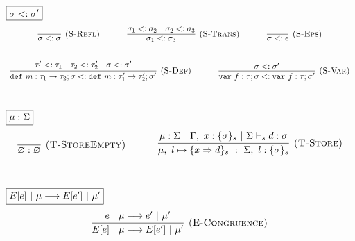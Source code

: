 \documentclass{llncs}
\newcommand{\keywadj}[1]{\mathtt{#1}}
\newcommand{\keyw}[1]{\keywadj{#1}~}
\begin{document}
$\fbox{$\sigma <: \sigma'$}$
\[
\begin{array}{c}
\infer[\textsc{(S-Refl)}]
  {\sigma <: \sigma}
  {}%
~~~~~~~~~~
\infer[\textsc{(S-Trans)}]
  {\sigma_1 <: \sigma_3}
  {\sigma_1 <: \sigma_2 & \sigma_2 <: \sigma_3}%
~~~~~~~~~~
\infer[\textsc{(S-Eps)}]
  {\sigma <: \epsilon}
  {}\\[5ex]

\infer[\textsc{(S-Def)}]
  {\keyw{def} m:\tau_1 \rightarrow \tau_2; \sigma <: \keyw{def} m:\tau_1' \rightarrow \tau_2'; \sigma'}
  {\tau_1' <: \tau_1 & \tau_2 <: \tau_2' & \sigma <: \sigma'}%
~~~~~~~~~~
\infer[\textsc{(S-Var)}]
  {\keyw{var} f:\tau; \sigma <: \keyw{var} f:\tau; \sigma'}
  {\sigma <: \sigma'}\\[5ex]  

\end{array}
\]

$\fbox{$\mu : \Sigma$}$
\[
\begin{array}{c}

\infer[\textsc{(T-StoreEmpty)}]
  {\varnothing : \varnothing}
  {}%
~~~~~~~~~~
\infer[\textsc{(T-Store)}]
  {\mu,~l \mapsto \{ x \Rightarrow d \}_s~:~\Sigma,~l : \{ \sigma \}_s}
  {\mu : \Sigma & \Gamma,~x : \{ \sigma \}_s~|~\Sigma \vdash_s d : \sigma}\\[5ex]

\end{array}
\]

$\fbox{$E[e]~|~\mu \longrightarrow E[e']~|~\mu'$}$
\[
\begin{array}{c}
\infer[\textsc{(E-Congruence)}]
  {E[e]~|~\mu \longrightarrow E[e']~|~\mu'}
  {e~|~\mu \longrightarrow e'~|~\mu'}\\[5ex]  
\end{array}
\]
\end{document}
